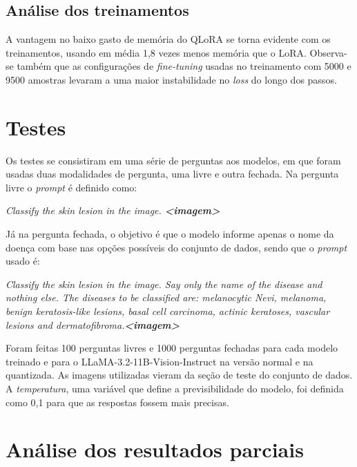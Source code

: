 \subsection{Análise dos treinamentos}

A vantagem no baixo gasto de memória do \ac{QLoRA} se torna evidente com os treinamentos, usando em média 1,8 vezes menos memória que o \ac{LoRA}. Observa-se também
que as configurações de \textit{fine-tuning} usadas no treinamento com 5000 e 9500 amostras levaram a uma maior instabilidade no \textit{loss} do longo dos passos.

\section{Testes}

Os testes se consistiram em uma série de perguntas aos modelos, em que foram usadas duas modalidades de pergunta, uma livre e outra fechada. Na pergunta livre o
\textit{prompt} é definido como:

\begin{dialogue}
     \textit{Classify the skin lesion in the image. \textbf{<imagem>}}
\end{dialogue}

Já na pergunta fechada, o objetivo é que o modelo informe apenas o nome da doença com base nas opções possíveis do conjunto de dados, sendo que o \textit{prompt} usado é:

\begin{dialogue}
     \textit{Classify the skin lesion in the image. Say only the name of the disease and nothing else. The diseases to be classified are: melanocytic Nevi,
        melanoma, benign keratosis-like lesions, basal cell carcinoma, actinic keratoses, vascular lesions and dermatofibroma.\textbf{<imagem>}}
\end{dialogue}

Foram feitas 100 perguntas livres e 1000 perguntas fechadas para cada modelo treinado e para o \ac{LLaMA}-3.2-11B-Vision-Instruct na versão normal e na quantizada. As
imagens utilizadas vieram da seção de teste do conjunto de dados. A \textit{temperatura}, uma variável que define a previsibilidade do modelo, foi definida como 0,1 para
que as respostas fossem mais precisas. 

\section{Análise dos resultados parciais}
